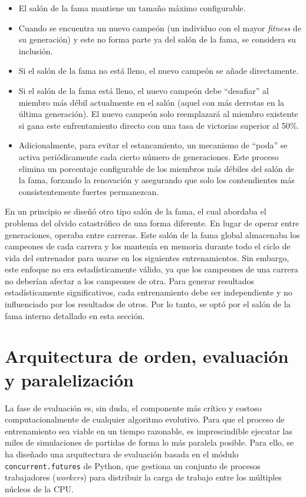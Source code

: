 \begin{itemize}
	\item El salón de la fama mantiene un tamaño máximo configurable.
	\item Cuando se encuentra un nuevo campeón (un individuo con el mayor \textit{fitness} de su generación) y este no forma parte ya del salón de la fama, se considera su inclusión.
	\item Si el salón de la fama no está lleno, el nuevo campeón se añade directamente.
	\item Si el salón de la fama está lleno, el nuevo campeón debe ``desafiar'' al miembro más débil actualmente en el salón (aquel con más derrotas en la última generación). El nuevo campeón solo reemplazará al miembro existente si gana este enfrentamiento directo con una tasa de victorias superior al 50\%.
	\item Adicionalmente, para evitar el estancamiento, un mecanismo de ``poda'' se activa periódicamente cada cierto número de generaciones. Este proceso elimina un porcentaje configurable de los miembros más débiles del salón de la fama, forzando la renovación y asegurando que solo los contendientes más consistentemente fuertes permanezcan.
\end{itemize}

En un principio se diseñó otro tipo salón de la fama, el cual abordaba el problema del olvido catastrófico de una forma diferente. En lugar de operar entre generaciones, operaba entre carreras. Este salón de la fama global almacenaba los campeones de cada carrera y los mantenía en memoria durante todo el ciclo de vida del entrenador para usarse en los siguientes entrenamientos. Sin embargo, este enfoque no era estadísticamente válido, ya que los campeones de una carrera no deberían afectar a los campeones de otra. Para generar resultados estadísticamente significativos, cada entrenamiento debe ser independiente y no influenciado por los resultados de otros. Por lo tanto, se optó por el salón de la fama interno detallado en esta sección.

\section{Arquitectura de orden, evaluación y paralelización} \label{sec:paralelizacion_algoritmo}

La fase de evaluación es, sin duda, el componente más crítico y costoso computacionalmente de cualquier algoritmo evolutivo. Para que el proceso de entrenamiento sea viable en un tiempo razonable, es imprescindible ejecutar las miles de simulaciones de partidas de forma lo más paralela posible. Para ello, se ha diseñado una arquitectura de evaluación basada en el módulo \texttt{concurrent.futures} de Python, que gestiona un conjunto de procesos trabajadores (\textit{workers}) para distribuir la carga de trabajo entre los múltiples núcleos de la CPU.

